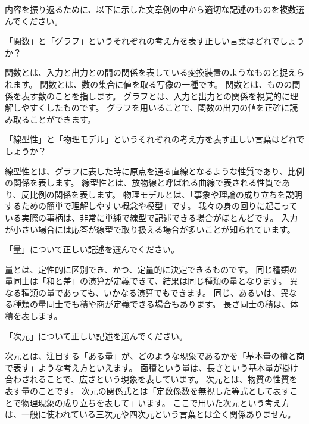 \documentclass[uplatex,dvipdfmx,a4paper,11pt]{jsarticle}
\begin{document}
内容を振り返るために、以下に示した文章例の中から適切な記述のものを複数選んでください。
\begin{qlist}
	\qitem 「関数」と「グラフ」というそれぞれの考え方を表す正しい言葉はどれでしょうか？
		\begin{qlist2}
			\qitem 関数とは、入力と出力との間の関係を表している変換装置のようなものと捉えられます。
			\qitem 関数とは、数の集合に値を取る写像の一種です。
			\qitem 関数とは、ものの関係を表す数のことを指します。
			\qitem グラフとは、入力と出力との関係を視覚的に理解しやすくしたものです。
			\qitem グラフを用いることで、関数の出力の値を正確に読み取ることができます。
		\end{qlist2}
    \vspace{3mm}
	\qitem 「線型性」と「物理モデル」というそれぞれの考え方を表す正しい言葉はどれでしょうか？
		\begin{qlist2}
			\qitem 線型性とは、グラフに表した時に原点を通る直線となるような性質であり、比例の関係を表します。
			\qitem 線型性とは、放物線と呼ばれる曲線で表される性質であり、反比例の関係を表します。
			\qitem 物理モデルとは、「事象や理論の成り立ちを説明するための簡単で理解しやすい概念や模型」です。
			\qitem 我々の身の回りに起こっている実際の事柄は、非常に単純で線型で記述できる場合がほとんどです。
			\qitem 入力が小さい場合には応答が線型で取り扱える場合が多いことが知られています。
    \end{qlist2}
    \vspace{3mm}
	\qitem 「量」について正しい記述を選んでください。
		\begin{qlist2}
			\qitem 量とは、定性的に区別でき、かつ、定量的に決定できるものです。
			\qitem 同じ種類の量同士は「和と差」の演算が定義できて、結果は同じ種類の量となります。
			\qitem 異なる種類の量であっても、いかなる演算でもできます。
			\qitem 同じ、あるいは、異なる種類の量同士でも積や商が定義できる場合もあります。
			\qitem 長さ同士の積は、体積を表します。
    \end{qlist2}
    \vspace{3mm}
	\qitem 「次元」について正しい記述を選んでください。
		\begin{qlist2}
			\qitem 次元とは、注目する「ある量」が、どのような現象であるかを「基本量の積と商で表す」ような考え方といえます。
			\qitem 面積という量は、長さという基本量が掛け合わされることで、広さという現象を表しています。
			\qitem 次元とは、物質の性質を表す量のことです。
			\qitem 次元の関係式とは「定数係数を無視した等式として表すことで物理現象の成り立ちを表して」います。
			\qitem ここで用いた次元という考え方は、一般に使われている三次元や四次元という言葉とは全く関係ありません。

\end{qlist2}
\end{qlist}
\end{document}
